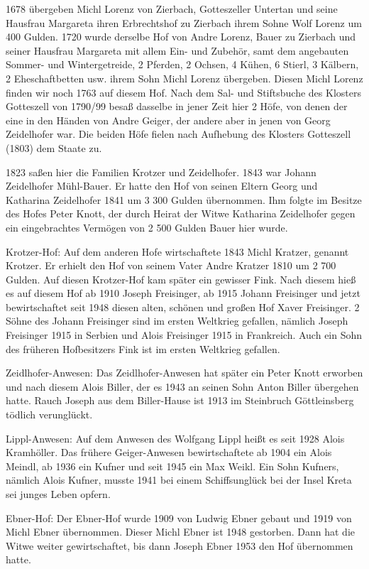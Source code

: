 1678 übergeben Michl Lorenz von Zierbach, Gotteszeller Untertan und seine
Hausfrau Margareta ihren Erbrechtshof zu Zierbach ihrem Sohne Wolf Lorenz um 400
Gulden. 1720 wurde derselbe Hof von Andre Lorenz, Bauer zu Zierbach und seiner
Hausfrau Margareta mit allem Ein- und Zubehör, samt dem angebauten Sommer- und
Wintergetreide, 2 Pferden, 2 Ochsen, 4 Kühen, 6 Stierl, 3 Kälbern, 2
Eheschaftbetten usw. ihrem Sohn Michl Lorenz übergeben. Diesen Michl Lorenz
finden wir noch 1763 auf diesem Hof. Nach dem Sal- und Stiftsbuche des Klosters
Gotteszell von 1790/99 besaß dasselbe in jener Zeit hier 2 Höfe, von denen der
eine in den Händen von Andre Geiger, der andere aber in jenen von Georg
Zeidelhofer war. Die beiden Höfe fielen nach Aufhebung des Klosters Gotteszell
(1803) dem Staate zu.

1823 saßen hier die Familien Krotzer und Zeidelhofer. 1843 war Johann
Zeidelhofer Mühl-Bauer. Er hatte den Hof von seinen Eltern Georg und Katharina
Zeidelhofer 1841 um 3 300 Gulden übernommen. Ihm folgte im Besitze des Hofes
Peter Knott, der durch Heirat der Witwe Katharina Zeidelhofer gegen ein
eingebrachtes Vermögen von 2 500 Gulden Bauer hier wurde.

Krotzer-Hof: Auf dem anderen Hofe wirtschaftete 1843 Michl Kratzer, genannt
Krotzer. Er erhielt den Hof von seinem Vater Andre Kratzer 1810 um 2 700 Gulden.
Auf diesen Krotzer-Hof kam später ein gewisser Fink. Nach diesem hieß es auf
diesem Hof ab 1910 Joseph Freisinger, ab 1915 Johann Freisinger und jetzt
bewirtschaftet seit 1948 diesen alten, schönen und großen Hof Xaver Freisinger.
2 Söhne des Johann Freisinger sind im ersten Weltkrieg gefallen, nämlich Joseph
Freisinger 1915 in Serbien und Alois Freisinger 1915 in Frankreich. Auch ein
Sohn des früheren Hofbesitzers Fink ist im ersten Weltkrieg gefallen.

Zeidlhofer-Anwesen: Das Zeidlhofer-Anwesen hat später ein Peter Knott erworben
und nach diesem Alois Biller, der es 1943 an seinen Sohn Anton Biller übergehen
hatte. Rauch Joseph aus dem Biller-Hause ist 1913 im Steinbruch Göttleinsberg
tödlich verunglückt.

Lippl-Anwesen: Auf dem Anwesen des Wolfgang Lippl heißt es seit 1928 Alois
Kramhöller. Das frühere Geiger-Anwesen bewirtschaftete ab 1904 ein Alois Meindl,
ab 1936 ein Kufner und seit 1945 ein Max Weikl. Ein Sohn Kufners, nämlich Alois
Kufner, musste 1941 bei einem Schiffsunglück bei der Insel Kreta sei junges
Leben opfern.

Ebner-Hof: Der Ebner-Hof wurde 1909 von Ludwig Ebner gebaut und 1919 von Michl
Ebner übernommen. Dieser Michl Ebner ist 1948 gestorben. Dann hat die Witwe
weiter gewirtschaftet, bis dann Joseph Ebner 1953 den Hof übernommen hatte.

